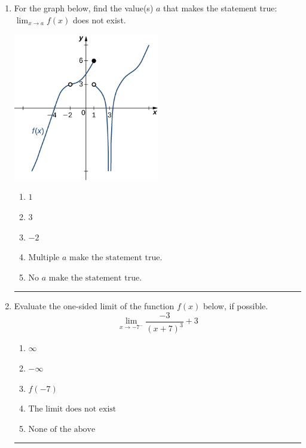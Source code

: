 \documentclass[14pt]{extbook}
\newcommand{\litem}[1]{\item#1\hspace*{-1cm}\rule{\textwidth}{0.4pt}}
\begin{document}
\begin{enumerate}
\litem{
For the graph below, find the value(s) $a$ that makes the statement true: $ \displaystyle \lim_{x \rightarrow a} f(x)$ does not exist.
\begin{center}
    \includegraphics[width=0.5\textwidth]{../Figures/evaluateLimitGraphicallyB.png}
\end{center}
\begin{enumerate}[label=\Alph*.]
\item \( 1 \)
\item \( 3 \)
\item \( -2 \)
\item \( \text{Multiple } a \text{ make the statement true}. \)
\item \( \text{No } a \text{ make the statement true}. \)

\end{enumerate} }
\litem{
Evaluate the one-sided limit of the function $f(x)$ below, if possible.\[ \lim_{x \rightarrow -7^-} \frac{-3}{(x+7)^3}+3 \]\begin{enumerate}[label=\Alph*.]
\item \( \infty \)
\item \( -\infty \)
\item \( f(-7) \)
\item \( \text{The limit does not exist} \)
\item \( \text{None of the above} \)


\end{enumerate}}
\end{enumerate}
\end{document}
